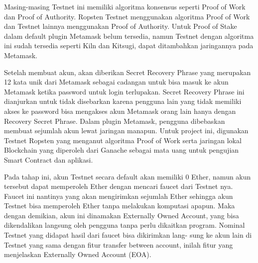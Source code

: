 Masing-masing Testnet ini memiliki algoritma konsensus seperti Proof of Work dan Proof of Authority. Ropsten Testnet menggunakan algoritma Proof of Work dan Testnet lainnya menggunakan Proof of Authority. Untuk Proof of Stake dalam default plugin Metamask belum tersedia, namun Testnet dengan algoritma ini sudah tersedia seperti Kiln dan Kitsugi, dapat ditambahkan jaringannya pada Metamask.

Setelah membuat akun, akan diberikan Secret Recovery Phrase yang merupakan 12 kata unik dari Metamask sebagai cadangan untuk bisa masuk ke akun Metamask ketika password untuk login terlupakan. Secret Recovery Phrase ini dianjurkan untuk tidak disebarkan karena pengguna lain yang tidak memiliki akses ke password bisa mengakses akun Metamask orang lain hanya dengan Recovery Secret Phrase. Dalam plugin Metamask, pengguna dibebaskan membuat sejumlah akun lewat jaringan manapun. Untuk project ini, digunakan Testnet Ropsten yang menganut algoritma Proof of Work serta jaringan lokal Blockchain yang diperoleh dari Ganache sebagai mata uang untuk pengujian Smart Contract dan aplikasi.

Pada tahap ini, akun Testnet secara default akan memiliki 0 Ether, namun akun tersebut dapat memperoleh Ether dengan mencari faucet dari Testnet nya. Faucet ini nantinya yang akan mengirimkan sejumlah Ether sehingga akun Testnet bisa memperoleh Ether tanpa melakukan komputasi apapun. Maka dengan demikian, akun ini dinamakan Externally Owned Account, yang bisa dikendalikan langsung oleh pengguna tanpa perlu dikaitkan program. Nominal Testnet yang didapat hasil dari faucet bisa dikirimkan lang- sung ke akun lain di Testnet yang sama dengan fitur transfer between account, inilah fitur yang menjelaskan Externally Owned Account (EOA).

